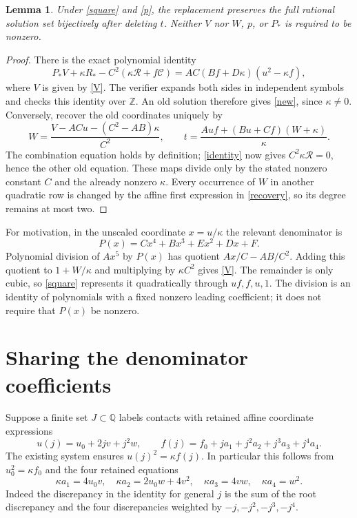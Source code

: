 \documentclass[11pt]{article}
\newtheorem{lemma}[theorem]{Lemma}
\newcommand{\Q}{\mathbb Q}
\begin{document}
\begin{lemma}\label{lemma}
Under \eqref{square} and \eqref{p}, the replacement preserves the full
rational solution set bijectively after deleting $t$. Neither $V$ nor
$W$, $p$, or $P_*$ is required to be nonzero.
\end{lemma}
\begin{proof}
There is the exact polynomial identity
\begin{equation}\label{identity}
 P_*V+\kappa R_*-C^2(\kappa\mathcal R+f\mathcal C)
       =AC(Bf+D\kappa)(u^2-\kappa f),
\end{equation}
where $V$ is given by \eqref{V}. The verifier expands both sides in
independent symbols and checks this identity over $\mathbb Z$.
An old solution therefore gives \eqref{new}, since $\kappa\ne0$.
Conversely, recover the old coordinates uniquely by
\begin{equation}\label{recovery}
 W=\frac{V-ACu-(C^2-AB)\kappa}{C^2},\qquad
 t=\frac{Auf+(Bu+Cf)(W+\kappa)}{\kappa}.
\end{equation}
The combination equation holds by definition; \eqref{identity} now
gives $C^2\kappa\mathcal R=0$, hence the other old equation. These
maps divide only by the stated nonzero constant $C$ and the already
nonzero $\kappa$. Every occurrence of $W$ in another quadratic row is
changed by the affine first expression in \eqref{recovery}, so its
degree remains at most two.
\end{proof}

For motivation, in the unscaled coordinate $x=u/\kappa$ the relevant
denominator is
\[
 P(x)=Cx^4+Bx^3+Ex^2+Dx+F.
\]
Polynomial division of $Ax^5$ by $P(x)$ has quotient
$Ax/C-AB/C^2$. Adding this quotient to $1+W/\kappa$ and
multiplying by $\kappa C^2$ gives \eqref{V}. The remainder is only cubic, so
\eqref{square} represents it quadratically through $uf,f,u,1$.
The division is an identity of polynomials with a fixed nonzero leading
coefficient; it does not require that $P(x)$ be nonzero.

\section{Sharing the denominator coefficients}

Suppose a finite set $J\subset\Q$ labels contacts with retained affine
coordinate expressions
\begin{equation}\label{progression}
 u(j)=u_0+2jv+j^2w,\qquad
 f(j)=f_0+ja_1+j^2a_2+j^3a_3+j^4a_4.
\end{equation}
The existing system ensures $u(j)^2=\kappa f(j)$. In particular this
follows from $u_0^2=\kappa f_0$ and the four retained equations
\[
 \kappa a_1=4u_0v,\quad
 \kappa a_2=2u_0w+4v^2,\quad
 \kappa a_3=4vw,\quad \kappa a_4=w^2.
\]
Indeed the discrepancy in the identity for general $j$ is the sum of
the root discrepancy and the four discrepancies weighted by
$-j,-j^2,-j^3,-j^4$.
\end{document}
